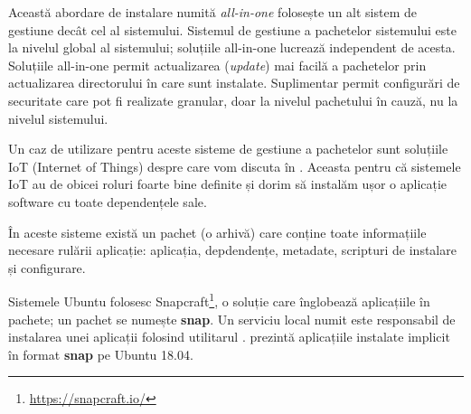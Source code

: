 Această abordare de instalare numită \textit{all-in-one} folosește un alt sistem de gestiune decât cel al sistemului.
Sistemul de gestiune a pachetelor sistemului este la nivelul global al sistemului;
soluțiile all-in-one lucrează independent de acesta.
Soluțiile all-in-one permit actualizarea (\textit{update}) mai facilă a pachetelor prin actualizarea directorului în care sunt instalate.
Suplimentar permit configurări de securitate care pot fi realizate granular, doar la nivelul pachetului în cauză, nu la nivelul sistemului.

Un caz de utilizare pentru aceste sisteme de gestiune a pachetelor sunt soluțiile IoT (Internet of Things) despre care vom discuta în .
Aceasta pentru că sistemele IoT au de obicei roluri foarte bine definite și dorim să instalăm ușor o aplicație software cu toate dependențele sale.

În aceste sisteme există un pachet (o arhivă) care conține toate informațiile necesare rulării aplicație: aplicația, depdendențe, metadate, scripturi de instalare și configurare.

Sistemele Ubuntu folosesc Snapcraft\footnote{\url{https://snapcraft.io/}}, o soluție care înglobează aplicațiile în pachete;
un pachet se numește \textbf{snap}.
Un serviciu local numit  este responsabil de instalarea unei aplicații folosind utilitarul .
 prezintă aplicațiile instalate implicit în format \textbf{snap} pe Ubuntu 18.04.


